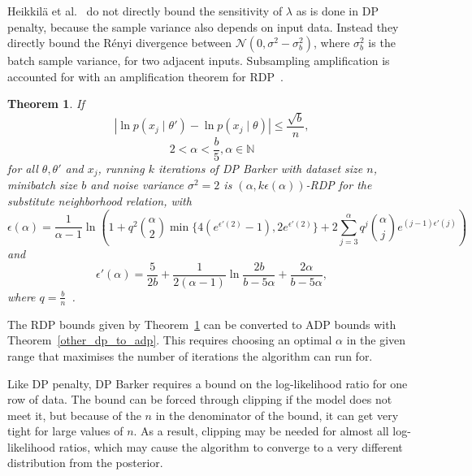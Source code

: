 \documentclass[english,twoside,openright]{HYgraduMLDS}
\newtheorem{theorem}[lemma]{Theorem}
\newcommand{\N}{\mathbb{N}}
\newcommand{\caln}{{\mathcal{N}}}
\begin{document}
Heikkilä et al.~\cite{HeikkilaJDH19} do not directly bound the sensitivity
of \(\lambda\) as is done in DP penalty, because the sample variance also 
depends on input data. Instead they directly bound the Rényi divergence 
between \(\caln(0, \sigma^2 - \sigma^2_b)\), where \(\sigma^2_b\) is the 
batch sample variance, for two adjacent inputs. Subsampling amplification 
is accounted for with an amplification theorem for RDP~\cite{WangBK19}.

\begin{theorem}\label{dp_barker_theorem}
    If
    \[
        |\ln p(x_j\mid \theta') - \ln p(x_j\mid \theta)| \leq \frac{\sqrt{b}}{n},
    \]
    \[
        2 < \alpha < \frac{b}{5}, \alpha \in \N
    \]
    for all \(\theta, \theta'\) and \(x_{j}\),
    running \(k\) iterations of DP Barker with dataset size \(n\),
    minibatch size \(b\) and noise variance \(\sigma^{2} = 2\)
    is \((\alpha, k\epsilon(\alpha))\)-RDP for the substitute neighborhood
    relation, with
    \[
        \epsilon(\alpha) = \frac{1}{\alpha - 1}\ln \left(
        1 + q^2\binom{\alpha}{2}\min\{4(e^{\epsilon'(2)} - 1), 2e^{\epsilon'(2)}\}
        + 2 \sum_{j=3}^\alpha q^j\binom{\alpha}{j}e^{(j-1)\epsilon'(j)}\right)
    \]
    and 
    \[
        \epsilon'(\alpha) = \frac{5}{2b} + \frac{1}{2(\alpha - 1)}
        \ln \frac{2b}{b - 5\alpha} + \frac{2\alpha}{b - 5\alpha},
    \]
    where \(q = \frac{b}{n}\)~\cite{HeikkilaJDH19}.
\end{theorem}
The RDP bounds given by Theorem~\ref{dp_barker_theorem} can be converted to
ADP bounds with Theorem~\ref{other_dp_to_adp}. This requires choosing an
optimal \(\alpha\) in the given range that maximises the number of iterations
the algorithm can run for.


Like DP penalty, DP Barker requires a bound on the log-likelihood ratio for
one row of data. The bound can be forced through clipping if the model does not 
meet it, but because of the \(n\) in the denominator of the bound, it can get 
very tight for large values of \(n\). As a result, clipping may be needed for 
almost all log-likelihood ratios, which may cause the algorithm to converge
to a very different distribution from the posterior.
\end{document}
